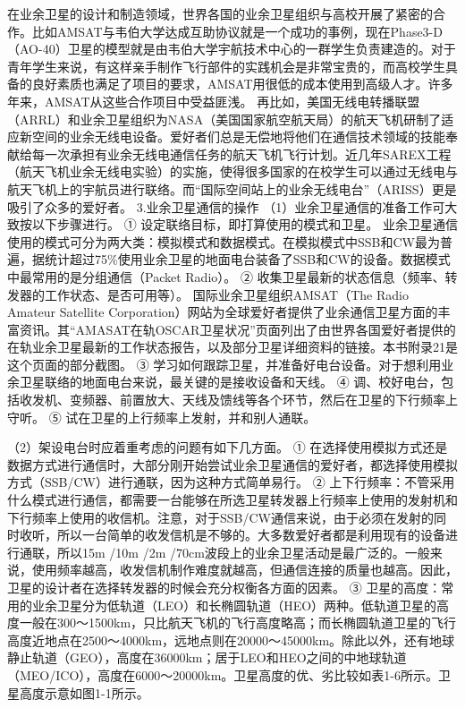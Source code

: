 \documentclass[12pt,UTF8]{ctexbook}
\begin{document}
在业余卫星的设计和制造领域，世界各国的业余卫星组织与高校开展了紧密的合作。比如AMSAT与韦伯大学达成互助协议就是一个成功的事例，现在Phase3-D（AO-40）卫星的模型就是由韦伯大学宇航技术中心的一群学生负责建造的。对于青年学生来说，有这样亲手制作飞行部件的实践机会是非常宝贵的，而高校学生具备的良好素质也满足了项目的要求，AMSAT用很低的成本使用到高级人才。许多年来，AMSAT从这些合作项目中受益匪浅。
再比如，美国无线电转播联盟（ARRL）和业余卫星组织为NASA（美国国家航空航天局）的航天飞机研制了适应新空间的业余无线电设备。爱好者们总是无偿地将他们在通信技术领域的技能奉献给每一次承担有业余无线电通信任务的航天飞机飞行计划。近几年SAREX工程（航天飞机业余无线电实验）的实施，使得很多国家的在校学生可以通过无线电与航天飞机上的宇航员进行联络。而“国际空间站上的业余无线电台”（ARISS）更是吸引了众多的爱好者。
3.业余卫星通信的操作
（1）业余卫星通信的准备工作可大致按以下步骤进行。
① 设定联络目标，即打算使用的模式和卫星。
业余卫星通信使用的模式可分为两大类：模拟模式和数据模式。在模拟模式中SSB和CW最为普遍，据统计超过75\%使用业余卫星的地面电台装备了SSB和CW的设备。数据模式中最常用的是分组通信（Packet Radio）。
② 收集卫星最新的状态信息（频率、转发器的工作状态、是否可用等）。
国际业余卫星组织AMSAT（The Radio Amateur Satellite Corporation）网站为全球爱好者提供了业余通信卫星方面的丰富资讯。其“AMASAT在轨OSCAR卫星状况”页面列出了由世界各国爱好者提供的在轨业余卫星最新的工作状态报告，以及部分卫星详细资料的链接。本书附录21是这个页面的部分截图。
③ 学习如何跟踪卫星，并准备好电台设备。对于想利用业余卫星联络的地面电台来说，最关键的是接收设备和天线。
④ 调、校好电台，包括收发机、变频器、前置放大、天线及馈线等各个环节，然后在卫星的下行频率上守听。
⑤ 试在卫星的上行频率上发射，并和别人通联。

（2）架设电台时应着重考虑的问题有如下几方面。
① 在选择使用模拟方式还是数据方式进行通信时，大部分刚开始尝试业余卫星通信的爱好者，都选择使用模拟方式（SSB/CW）进行通联，因为这种方式简单易行。
② 上下行频率：不管采用什么模式进行通信，都需要一台能够在所选卫星转发器上行频率上使用的发射机和下行频率上使用的收信机。注意，对于SSB/CW通信来说，由于必须在发射的同时收听，所以一台简单的收发信机是不够的。大多数爱好者都是利用现有的设备进行通联，所以15m /10m /2m /70cm波段上的业余卫星活动是最广泛的。一般来说，使用频率越高，收发信机制作难度就越高，但通信连接的质量也越高。因此，卫星的设计者在选择转发器的时候会充分权衡各方面的因素。
③ 卫星的高度：常用的业余卫星分为低轨道（LEO）和长椭圆轨道（HEO）两种。低轨道卫星的高度一般在300～1500km，只比航天飞机的飞行高度略高；而长椭圆轨道卫星的飞行高度近地点在2500～4000km，远地点则在20000～45000km。除此以外，还有地球静止轨道（GEO），高度在36000km；居于LEO和HEO之间的中地球轨道（MEO/ICO），高度在6000～20000km。卫星高度的优、劣比较如表1-6所示。卫星高度示意如图1-1所示。
\end{document}
